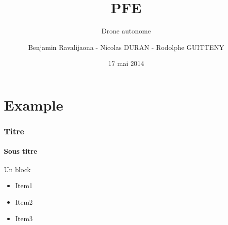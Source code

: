 \documentclass[transparent]{beamer}
\title{PFE \\ }
\subtitle{Drone autonome}
\author{Benjamin  Ravalijaona - Nicolas DURAN - Rodolphe GUITTENY}
\institute{SCIA 2015 \\ EPITA}
\date{17 mai 2014}
\begin{document}
\begin{frame}
	\titlepage
\end{frame}


\section{Example}


\begin{frame}
	\frametitle{Titre}
	\framesubtitle{Sous titre}

	\begin{block}{Un block}
			\begin{itemize}
				\item Item1
				\item Item2
				\item Item3
			\end{itemize}
	\end{block}
\end{frame}
\end{document}
